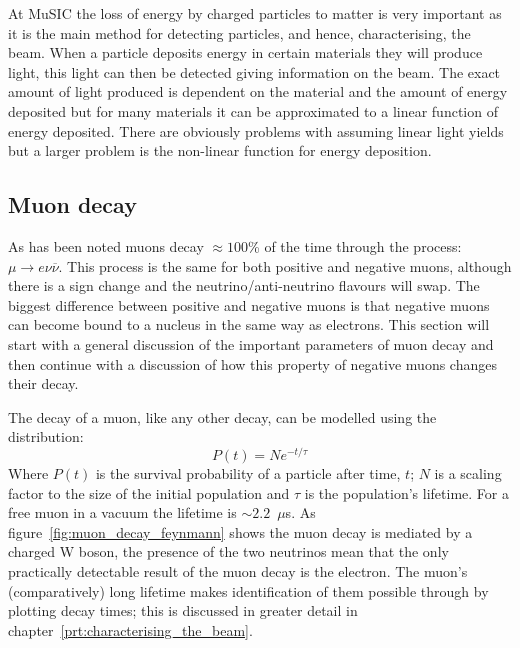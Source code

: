 At MuSIC the loss of energy by charged particles to matter is very important as it is the main method for detecting particles, and hence, characterising, the beam. When a particle deposits energy in certain materials they will produce light, this light can then be detected giving information on the beam. The exact amount of light produced is dependent on the material and the amount of energy deposited but for many materials it can be approximated to a linear function of energy deposited. There are obviously problems with assuming linear light yields but a larger problem is the non-linear function for energy deposition. 

\subsection{Muon decay} %
\label{sec:muon_decay}
As has been noted muons decay \(\approx100\)\% of the time through the process: \( \mu \rightarrow e \nu \overline{\nu}  \). This process is the same for both positive and negative muons, although there is a sign change and the neutrino/anti-neutrino flavours will swap. The biggest difference between positive and negative muons is that negative muons can become bound to a nucleus in the same way as electrons. This section will start with a general discussion of the important parameters of muon decay and then continue with a discussion of how this property of negative muons changes their decay.

The decay of a muon, like any other decay, can be modelled using the distribution:
\begin{equation}\label{eq:poisson}
  P(t) = Ne^{-t/\tau}
\end{equation}
Where \( P(t) \) is the survival probability of a particle after time, \( t \); \( N \) is a scaling factor to the size of the initial population and \( \tau \) is the population's lifetime. For a free muon in a vacuum the lifetime is \( \sim2.2\)~\( \mu \)s. As figure~\ref{fig:muon_decay_feynmann} shows the muon decay is mediated by a charged W boson, the presence of the two neutrinos mean that the only practically detectable result of the muon decay is the electron. The muon's (comparatively) long lifetime makes identification of them possible through by plotting decay times; this is discussed in greater detail in chapter~\ref{prt:characterising_the_beam}. 


